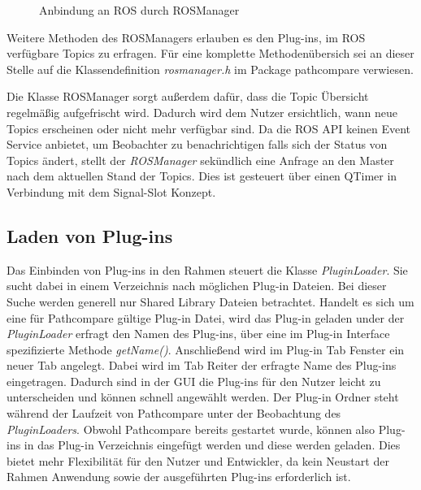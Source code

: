 \begin{figure}[t]
  \begin{center}
  \end{center}
  \caption{Anbindung an ROS durch ROSManager}
  \label{fig:rosmanager}
\end{figure}

Weitere Methoden des ROSManagers erlauben es den Plug-ins, im ROS verfügbare
Topics zu erfragen.
Für eine komplette Methodenübersich sei an dieser Stelle auf die
Klassendefinition \textit{rosmanager.h} im Package pathcompare verwiesen.

Die Klasse ROSManager sorgt außerdem dafür, dass die Topic Übersicht
regelmäßig aufgefrischt wird. Dadurch wird dem Nutzer ersichtlich, wann neue
Topics erscheinen oder nicht mehr verfügbar sind. Da die
ROS \gls{API} keinen Event Service anbietet, um Beobachter zu benachrichtigen
falls sich der Status von Topics ändert, stellt der
\textit{ROSManager} sekündlich eine Anfrage an den Master nach dem
aktuellen Stand der Topics. Dies ist gesteuert über einen QTimer in Verbindung
mit dem Signal-Slot Konzept.

\subsection{Laden von Plug-ins}
Das Einbinden von Plug-ins in den Rahmen steuert die Klasse
\textit{PluginLoader}. Sie sucht dabei in einem Verzeichnis nach möglichen
Plug-in Dateien. Bei dieser Suche werden generell nur Shared Library
Dateien betrachtet. Handelt es sich um eine für Pathcompare gültige
Plug-in Datei, wird das Plug-in geladen under der \textit{PluginLoader} erfragt
den Namen des Plug-ins,
über eine im Plug-in Interface spezifizierte Methode \textit{getName()}.
Anschließend wird im Plug-in Tab Fenster ein neuer Tab angelegt. Dabei wird im
Tab Reiter der erfragte Name des Plug-ins eingetragen. Dadurch sind in der GUI
die Plug-ins für den Nutzer leicht zu unterscheiden und können schnell
angewählt werden.  Der Plug-in Ordner steht während der Laufzeit von
Pathcompare unter der Beobachtung des \textit{PluginLoaders}.  Obwohl
Pathcompare bereits gestartet wurde, können also Plug-ins in das
Plug-in Verzeichnis eingefügt werden und diese werden geladen. Dies bietet mehr
Flexibilität für den Nutzer und Entwickler, da kein Neustart der Rahmen
Anwendung sowie der ausgeführten Plug-ins erforderlich ist.

